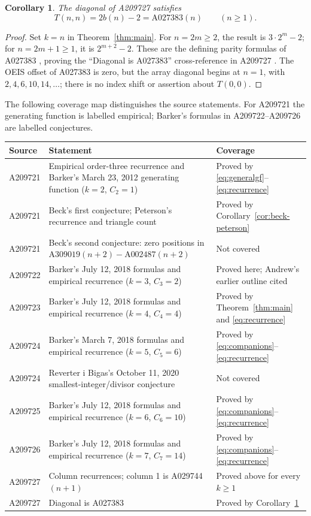 \documentclass[11pt]{article}
\newtheorem{corollary}{Corollary}
\begin{document}
\begin{corollary}\label{cor:diagonal}
The diagonal of A209727 satisfies
\[
 T(n,n)=2b(n)-2=\mathrm{A027383}(n)\qquad(n\geq1).
\]
\end{corollary}
\begin{proof}
Set $k=n$ in Theorem~\ref{thm:main}. For $n=2m\geq2$, the result is
$3\cdot2^m-2$; for $n=2m+1\geq1$, it is $2^{m+2}-2$.
These are the defining parity formulas of A027383 \cite{a027383}, proving
the ``Diagonal is A027383'' cross-reference in A209727 \cite{a209727}.
The OEIS offset of A027383 is zero, but the array diagonal begins at
$n=1$, with $2,4,6,10,14,\ldots$; there is no index shift or assertion
about $T(0,0)$.
\end{proof}

The following coverage map distinguishes the source statements.
For A209721 the generating function is labelled empirical; Barker's
formulas in A209722--A209726 are labelled conjectures.
\begin{center}
\small
\begin{tabularx}{\textwidth}{@{}p{}X p{}@{}}
\toprule
Source & Statement & Coverage\\
\midrule
A209721 \cite{a209721} & Empirical order-three recurrence and Barker's
March 23, 2012 generating function ($k=2$, $C_2=1$)
& Proved by \eqref{eq:generalgf}--\eqref{eq:recurrence}\\
A209721 & Beck's first conjecture; Peterson's recurrence and triangle count
& Proved by Corollary~\ref{cor:beck-peterson}\\
A209721 & Beck's second conjecture: zero positions in
$\mathrm{A309019}(n+2)-\mathrm{A002487}(n+2)$ & Not covered\\
A209722 \cite{a209722} & Barker's July 12, 2018 formulas and empirical
recurrence ($k=3$, $C_3=2$) & Proved here; Andrew's earlier outline
\cite{andrew} cited\\
A209723 \cite{a209723} & Barker's July 12, 2018 formulas and empirical
recurrence ($k=4$, $C_4=4$) & Proved by Theorem~\ref{thm:main} and
\eqref{eq:recurrence}\\
A209724 \cite{a209724} & Barker's March 7, 2018 formulas and empirical
recurrence ($k=5$, $C_5=6$) & Proved by \eqref{eq:companions}--\eqref{eq:recurrence}\\
A209724 & Reverter i Bigas's October 11, 2020 smallest-integer/divisor
conjecture & Not covered\\
A209725 \cite{a209725} & Barker's July 12, 2018 formulas and empirical
recurrence ($k=6$, $C_6=10$) & Proved by \eqref{eq:companions}--\eqref{eq:recurrence}\\
A209726 \cite{a209726} & Barker's July 12, 2018 formulas and empirical
recurrence ($k=7$, $C_7=14$) & Proved by \eqref{eq:companions}--\eqref{eq:recurrence}\\
A209727 \cite{a209727} & Column recurrences; column 1 is A029744$(n+1)$
& Proved above for every $k\geq1$\\
A209727 & Diagonal is A027383 & Proved by Corollary~\ref{cor:diagonal}\\
\bottomrule
\end{tabularx}
\end{center}
\end{document}

